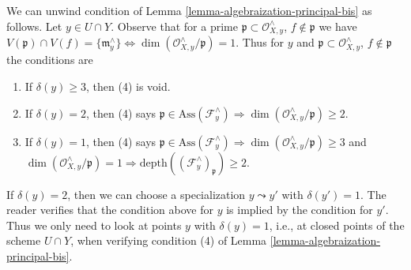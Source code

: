 \begin{remark}
\label{remark-unwinding-conditions}
We can unwind condition of
Lemma \ref{lemma-algebraization-principal-bis} as follows.
Let $y \in U \cap Y$. Observe that for a prime
$\mathfrak p \subset \mathcal{O}_{X, y}^\wedge$, $f \not \in \mathfrak p$
we have $V(\mathfrak p) \cap V(f) = \{\mathfrak m_y^\wedge\}
\Leftrightarrow \dim(\mathcal{O}_{X, y}^\wedge/\mathfrak p) = 1$.
Thus for $y$ and
$\mathfrak p \subset \mathcal{O}_{X, y}^\wedge$, $f \not \in \mathfrak p$
the conditions are
\begin{enumerate}
\item If $\delta(y) \geq 3$, then (4) is void.
\item If $\delta(y) = 2$, then (4) says
$\mathfrak p \in \text{Ass}(\mathcal{F}_y^\wedge)
\Rightarrow
\dim(\mathcal{O}_{X, y}^\wedge/\mathfrak p) \geq 2$.
\item If $\delta(y) = 1$, then (4) says
$\mathfrak p \in \text{Ass}(\mathcal{F}_y^\wedge)
\Rightarrow
\dim(\mathcal{O}_{X, y}^\wedge/\mathfrak p) \geq 3$
and $\dim(\mathcal{O}_{X, y}^\wedge/\mathfrak p) = 1
\Rightarrow \text{depth}((\mathcal{F}_y^\wedge)_\mathfrak p) \geq 2$.
\end{enumerate}
If $\delta(y) = 2$, then we can choose a specialization
$y \leadsto y'$ with $\delta(y') = 1$. The reader verifies that
the condition above for $y$ is implied by the condition for $y'$.
Thus we only need to look at points $y$ with $\delta(y) = 1$, i.e.,
at closed points of the scheme $U \cap Y$, when verifying condition (4)
of Lemma \ref{lemma-algebraization-principal-bis}.
\end{remark}

